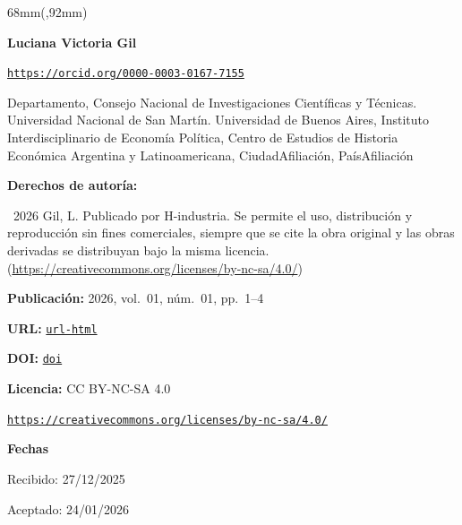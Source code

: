 \documentclass{article}
\newlength{\gbbloquex}
\begin{document}
\begin{textblock*}{68mm}(\gbbloquex,92mm)
{\setlength{\leftskip}{0pt}\setlength{\parindent}{0pt}%
\noindent\begin{minipage}[t]{68mm}
\sffamily\small\setlength{\parskip}{1pt}
{\bfseries\color{azulrevista}Luciana Victoria Gil}\par
{\scriptsize\texttt{\href{https://orcid.org/0000-0003-0167-7155}{https://orcid.org/0000-0003-0167-7155}}}\par
Departamento, Consejo Nacional de Investigaciones Científicas y Técnicas. Universidad Nacional de San Martín. Universidad de Buenos Aires, Instituto Interdisciplinario de Economía Política, Centro de Estudios de Historia Económica Argentina y Latinoamericana, CiudadAfiliación, PaísAfiliación\par
\vspace{6pt}
{\bfseries\color{azulrevista!70}Derechos de autor\'ia:}\par
\textcopyright\ 2026 Gil, L. Publicado por H-industria. Se permite el uso, distribución y reproducción sin fines comerciales, siempre que se cite la obra original y las obras derivadas se distribuyan bajo la misma licencia. (\href{https://creativecommons.org/licenses/by-nc-sa/4.0/}{https://creativecommons.org/licenses/by-nc-sa/4.0/})\par\vspace{6pt}
{\bfseries\color{azulrevista!70}Publicación:} 2026, vol.~01, n\'um.~01, pp.~1--4\par\vspace{6pt}
{\bfseries\color{azulrevista!70}URL:} {\scriptsize\texttt{\href{url-html}{url-html}}}\par\vspace{6pt}
{\bfseries\color{azulrevista!70}DOI:} {\scriptsize\texttt{\href{https://doi.org/doi}{doi}}}\par\vspace{6pt}
{\bfseries\color{azulrevista!70}Licencia:} CC BY-NC-SA 4.0\par
{\scriptsize\texttt{\href{https://creativecommons.org/licenses/by-nc-sa/4.0/}{https://creativecommons.org/licenses/by-nc-sa/4.0/}}}\par
\vspace{6pt}
{\bfseries\color{azulrevista!70}Fechas}\par\vspace{2pt}
Recibido: 27/12/2025\par
Aceptado: 24/01/2026\par

\end{minipage}}
\end{textblock*}
\end{document}
